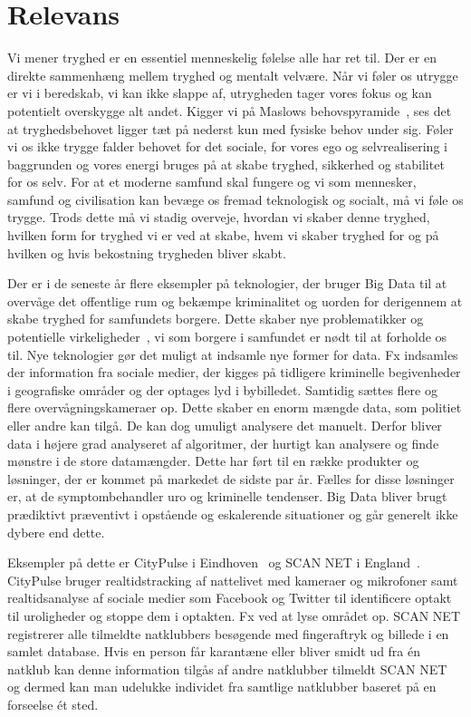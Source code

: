 \section{Relevans}
Vi mener tryghed er en essentiel menneskelig følelse alle har ret til. Der er en direkte sammenhæng mellem tryghed og mentalt velvære. Når vi føler os utrygge er vi i beredskab, vi kan ikke slappe af, utrygheden tager vores fokus og kan potentielt overskygge alt andet. Kigger vi på Maslows behovspyramide~\cite[]{maslow}, ses det at tryghedsbehovet ligger tæt på nederst kun med fysiske behov under sig. Føler vi os ikke trygge falder behovet for det sociale, for vores ego og selvrealisering i baggrunden og vores energi bruges på at skabe tryghed, sikkerhed og stabilitet for os selv. For at et moderne samfund skal fungere og vi som mennesker, samfund og civilisation kan bevæge os fremad teknologisk og socialt, må vi føle os trygge. Trods dette må vi stadig overveje, hvordan vi skaber denne tryghed, hvilken form for tryghed vi er ved at skabe, hvem vi skaber tryghed for og på hvilken og hvis bekostning trygheden bliver skabt. 


Der er i de seneste år flere eksempler på teknologier, der bruger Big Data til at overvåge det offentlige rum og bekæmpe kriminalitet og uorden for derigennem at skabe tryghed for samfundets borgere. Dette skaber nye problematikker og potentielle virkeligheder~\cite[]{Dunne:2013:SED:2613526}, vi som borgere i samfundet er nødt til at forholde os til. Nye teknologier gør det muligt at indsamle nye former for data. Fx indsamles der information fra sociale medier, der kigges på tidligere kriminelle begivenheder i geografiske områder og der optages lyd i bybilledet. Samtidig sættes flere og flere overvågningskameraer op. Dette skaber en enorm mængde data, som politiet eller andre kan tilgå. De kan dog umuligt analysere det manuelt. Derfor bliver data i højere grad analyseret af algoritmer, der hurtigt kan analysere og finde mønstre i de store datamængder. Dette har ført til en række produkter og løsninger, der er kommet på markedet de sidste par år. Fælles for disse løsninger er, at de symptombehandler uro og kriminelle tendenser. Big Data bliver brugt prædiktivt præventivt i opstående og eskalerende situationer og går generelt ikke dybere end dette. 

Eksempler på dette er CityPulse i Eindhoven~\cite[]{CityPulse} og SCAN NET i England~\cite[]{SCANNET}. CityPulse bruger realtidstracking af nattelivet med kameraer og mikrofoner samt realtidsanalyse af sociale medier som Facebook og Twitter til identificere optakt til uroligheder og stoppe dem i optakten. Fx ved at lyse området op. SCAN NET registrerer alle tilmeldte natklubbers besøgende med fingeraftryk og billede i en samlet database. Hvis en person får karantæne eller bliver smidt ud fra én natklub kan denne information tilgås af andre natklubber tilmeldt SCAN NET og dermed kan man udelukke individet fra samtlige natklubber baseret på en forseelse ét sted.

